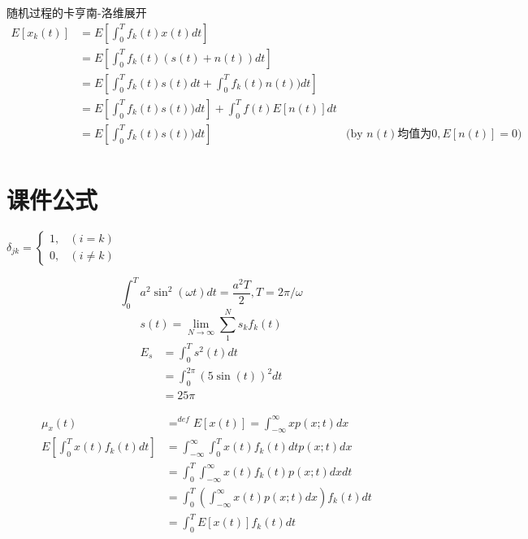 \begin{frame}{随机过程的卡亨南-洛维展开}
\begin{align*}
E[x_k(t)]&=E\left[\int_{0}^{T}f_k(t)x(t)dt\right]&\\
&=E\left[\int_{0}^{T}f_k(t)(s(t)+n(t))dt\right]&\\
&=E\left[\int_{0}^{T}f_k(t)s(t)dt+\int_{0}^{T}f_k(t)n(t))dt\right]&\\
&=E\left[\int_{0}^{T}f_k(t)s(t))dt\right]+\int_{0}^{T}f(t)E[n(t)]dt&\\
&=E\left[\int_{0}^{T}f_k(t)s(t))dt\right]& \text{(by $n(t)$均值为0},E[n(t)]=0)\\
\end{align*}
\end{frame}

\section{课件公式}

\begin{frame}
$\delta_{jk}=
\begin{cases}
	1, & (i=k)\\
	0, & (i\ne k)
\end{cases}
$
\end{frame}

\begin{frame}
\[\int_{0}^{T}a^2\sin^2(\omega t)dt=\frac{a^2T}{2}, T=2\pi/\omega\]
\[s(t)=\lim\limits_{N\to \infty}\sum_{1}^{N}s_kf_k(t)\]
\begin{align*}
E_s&=\int_{0}^{T}s^2(t)dt\\
&=\int_{0}^{2\pi}(5\sin(t))^2dt\\
&=25\pi
\end{align*}
\end{frame}

\begin{frame}
\begin{align*}
\mu_x(t)&\mathop{=}^{def}E[x(t)]=\int_{-\infty}^{\infty}xp(x;t)dx&\\
E[\int_{0}^{T}x(t)f_k(t)dt]&=\int_{-\infty}^{\infty}\int_{0}^{T}x(t)f_k(t)dtp(x;t)dx\\
&=\int_{0}^{T}\int_{-\infty}^{\infty}x(t)f_k(t)p(x;t)dxdt\\
&=\int_{0}^{T}\left(\int_{-\infty}^{\infty}x(t)p(x;t)dx\right)f_k(t)dt\\
&=\int_{0}^{T}E[x(t)]f_k(t)dt\\
\end{align*}
\end{frame}

